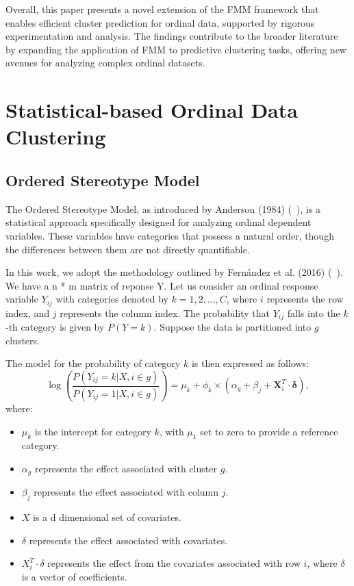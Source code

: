 \documentclass{article}
\begin{document}
Overall, this paper presents a novel extension of the FMM framework that enables efficient cluster prediction for ordinal data, supported by rigorous experimentation and analysis. 
The findings contribute to the broader literature by expanding the application of FMM to predictive clustering tasks, offering new avenues for analyzing complex ordinal datasets.


\section{Statistical-based Ordinal Data Clustering}

\subsection{Ordered Stereotype Model}

The Ordered Stereotype Model, as introduced by Anderson (1984) (~\cite{anderson1984regression}), 
is a statistical approach specifically designed for analyzing ordinal dependent variables. 
These variables have categories that possess a natural order, 
though the differences between them are not directly quantifiable.

In this work, we adopt the methodology outlined by Fernández et al. (2016) (~\cite{fernandez2016mixture}). 
We have a  n * m  matrix of reponse Y.
Let us consider an ordinal response variable \(Y_{ij}\) with categories denoted by \(k = 1, 2, \ldots, C\), 
where \(i\) represents the row index, and \(j\) represents the column index. 
The probability that \(Y_{ij}\) falls into the \(k\)-th category is given by \(P(Y = k)\). 
Suppose the data is partitioned into \(g\) clusters.

The model for the probability of category \(k\) is then expressed as follows:
\begin{equation}
  \log\left(\frac{P(Y_{ij} = k| X,i \in g)}{P(Y_{ij} = 1| X, i \in g)} \right) = \mu_k + \phi_k \times \left(\alpha_g + \beta_j + \bm{X}_i^T \cdot \bm{\delta} \right),
\end{equation}
where:

\begin{itemize}
    \item \(\mu_k\) is the intercept for category \(k\), with \(\mu_1\) set to zero to provide a reference category.
    \item \(\alpha_g\) represents the effect associated with cluster \(g\).
    \item \(\beta_j\) represents the effect associated with column \(j\).
    \item \(X\) is a d dimensional set of covariates.
    \item \(\delta\) represents the effect associated with covariates.
    \item \(X_i^T \cdot \delta\) represents the effect from the covariates associated with row \(i\), where \(\delta\) is a vector of coefficients.
\end{itemize}
\end{document}

